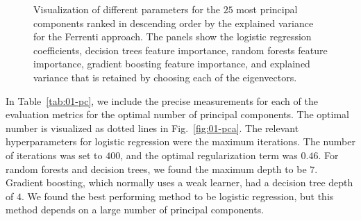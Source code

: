 \documentclass[superscriptaddress,unsortedaddress,
 amsmath,amssymb,
 aps,
]{revtex4-2}
\begin{document}
\begin{figure}[ht!]
  \begin{subfigure}[b]{0.5\textwidth}
    \centering
    
    \label{fig:01-fi-a}
  \end{subfigure}%

  \begin{subfigure}[b]{0.5\textwidth}
    \centering
    
    \label{fig:01-fi-b}
  \end{subfigure}%

  \begin{subfigure}[b]{0.5\textwidth}
    \centering
    
    \label{fig:01-fi-c}
  \end{subfigure}%

  \begin{subfigure}[b]{0.5\textwidth}
    \centering
    
    \label{fig:01-fi-d}
  \end{subfigure}%

  \begin{subfigure}[b]{0.5\textwidth}
    \centering
    
    \label{fig:01-fi-e}
  \end{subfigure}%
  \caption{Visualization of different parameters for the $25$ most principal components ranked in descending order by the explained variance for the Ferrenti approach. The panels show the logistic regression coefficients, decision trees feature importance, random forests feature importance, gradient boosting feature importance, and explained variance that is retained by choosing each of the eigenvectors. }
  \label{fig:01-fi}
\end{figure}

In Table~\ref{tab:01-pc}, we include the precise measurements for each of the evaluation metrics for the optimal number of principal components. The optimal number is visualized as dotted lines in Fig.~\ref{fig:01-pca}. The relevant hyperparameters for logistic regression were the maximum iterations. The number of iterations was set to $400$, and the optimal regularization term was $0.46$. For random forests and decision trees, we found the maximum depth to be $7$. Gradient boosting, which normally uses a weak learner, had a decision tree depth of $4$. We found the best performing method to be logistic regression, but this method depends on a large number of principal components. 
\end{document}
